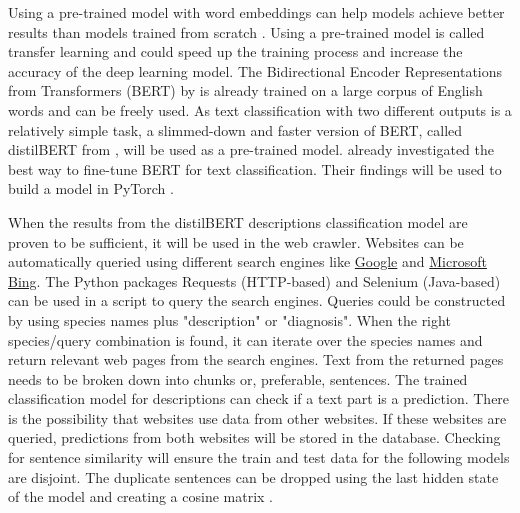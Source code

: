 \documentclass[a4paper, 12pt, oneside]{book} %
\begin{document}
Using a pre-trained model with word embeddings can help models achieve better results than models trained from scratch \autocite{mikolov_distributed_2013}.
Using a pre-trained model is called transfer learning and could speed up the training process and increase the accuracy of the deep learning model.
The Bidirectional Encoder Representations from Transformers (BERT) by \textcite{devlin_bert_2019} is already trained on a large corpus of English words and can be freely used.
As text classification with two different outputs is a relatively simple task, a slimmed-down and faster version of BERT, called distilBERT from \textcite{sanh_distilbert_2020}, will be used as a pre-trained model.
\textcite{sun_how_2020} already investigated the best way to fine-tune BERT for text classification. 
Their findings will be used to build a model in PyTorch \autocite{paszke_pytorch_2019}.

When the results from the distilBERT descriptions classification model are proven to be sufficient, it will be used in the web crawler.
Websites can be automatically queried using different search engines like \href{www.google.com}{Google} and \href{www.bing.com}{Microsoft Bing}.
The Python packages Requests (HTTP-based) and Selenium (Java-based) can be used in a script to query the search engines.
Queries could be constructed by using species names plus "description" or "diagnosis". 
When the right species/query combination is found, it can iterate over the species names and return relevant web pages from the search engines.
Text from the returned pages needs to be broken down into chunks or, preferable, sentences.
The trained classification model for descriptions can check if a text part is a prediction.
There is the possibility that websites use data from other websites.
If these websites are queried, predictions from both websites will be stored in the database.
Checking for sentence similarity will ensure the train and test data for the following models are disjoint.
The duplicate sentences can be dropped using the last hidden state of the model and creating a cosine matrix \autocite{reimers_sentence-bert_2019}.
\end{document}
